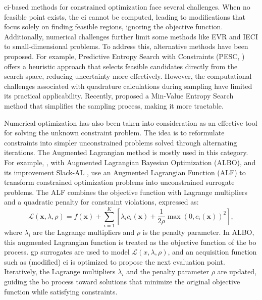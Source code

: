 \ac{ei}-based methods for constrained optimization face several challenges. When no feasible point exists, the \ac{ei} cannot be computed, leading to modifications that focus solely on finding feasible regions, ignoring the objective function. Additionally, numerical challenges further limit some methods like EVR and IECI to small-dimensional problems. To address this, alternative methods have been proposed. For example, Predictive Entropy Search with Constraints (PESC,  \citealp{hernandez2015predictive}) offers a heuristic approach that selects feasible candidates directly from the search space, reducing uncertainty more effectively. However, the computational challenges associated with quadrature calculations during sampling have limited its practical applicability. Recently, \citet{takeno2022sequential} proposed a Min-Value Entropy Search method that simplifies the sampling process, making it more tractable.

Numerical optimization has also been taken into consideration as an effective tool for solving the unknown constraint problem. The idea is to reformulate constraints into simpler unconstrained problems solved through alternating iterations. The Augmented Lagrangian method is mostly used in this category. For example, \citet{gramacy2016modeling}, with Augmented Lagrangian Bayesian Optimization (ALBO), and its improvement Slack-AL \citep{picheny2016bayesian}, use an Augmented Lagrangian Function (ALF) to transform constrained optimization problems into unconstrained surrogate problems. The ALF combines the objective function with Lagrange multipliers and a quadratic penalty for constraint violations, expressed as:  
\[
\mathcal{L}(\mathbf{x}, \lambda, \rho) = f(\mathbf{x}) + \sum_{i=1}^K \left[ \lambda_i c_i(\mathbf{x}) + \frac{1}{2\rho} \max(0, c_i(\mathbf{x}))^2 \right],
\]
where \( \lambda_i \) are the Lagrange multipliers and \( \rho \) is the penalty parameter. In ALBO, this augmented Lagrangian function is treated as the objective function of the \ac{bo} process. \ac{gp} surrogates are used to model \( \mathcal{L}(x, \lambda, \rho) \), and an acquisition function such as (modified) \ac{ei} is optimized to propose the next evaluation point. Iteratively, the Lagrange multipliers \( \lambda_i \) and the penalty parameter \( \rho \) are updated, guiding the \ac{bo} process toward solutions that minimize the original objective function while satisfying constraints.  

